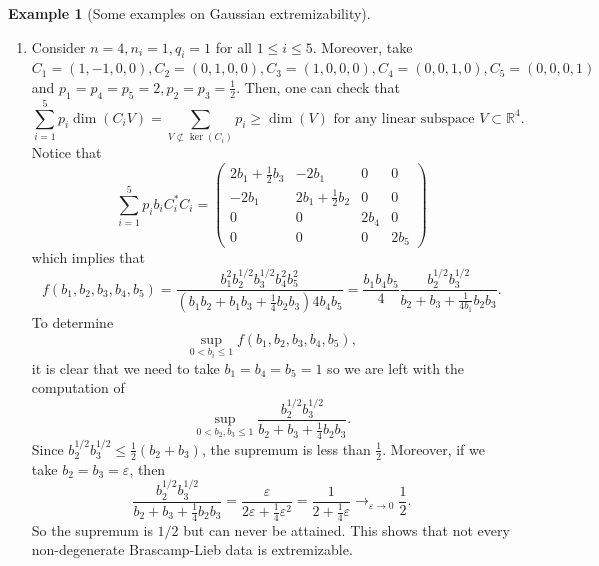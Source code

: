 \documentclass[11pt,a4paper,reqno]{amsart}
\numberwithin{equation}{section}
\theoremstyle{definition}
\newtheorem{example}[theorem]{Example}
\newcommand{\<}{\ensuremath \leq}
\renewcommand{\>}{\ensuremath \geq}
\renewcommand{\epsilon}{\varepsilon}
\begin{document}
\begin{example}[Some examples on Gaussian extremizability]
\hfill \\

\begin{enumerate} 

    \item [(i)]  Consider $n=4, n_i=1, q_i=1$ for all $1 \leq i \leq 5.$ Moreover, take $C_1=(1,-1,0,0), C_2=(0,1,0,0), C_3=(1,0,0,0), C_4=(0,0,1,0), C_5=(0,0,0,1)$ and $p_1=p_4=p_5=2,p_2=p_3=\frac{1}{2}.$ 
    Then, one can check that $$\sum_{i=1}^5 p_i\dim(C_iV)=\sum_{V \not \subset \ker(C_i)}p_i \geq \dim(V) \text{ for any linear subspace } V \subset \mathbb{R}^4.$$ 
    Notice that 
    $$\sum_{i=1}^5 p_ib_iC_i^*C_i=\begin{pmatrix}
     2b_1+\frac{1}{2}b_3 & -2b_1 & 0 & 0 \\
    -2b_1 & 2b_1+\frac{1}{2}b_2 & 0 & 0 \\
        0 & 0 & 2b_4 & 0 \\
        0 & 0 & 0 & 2b_5 
    \end{pmatrix}$$ 
    which implies that $$f(b_1,b_2,b_3,b_4,b_5)=\frac{b_1^2b_2^{1/2}b_3^{1/2}b_4^2b_5^2}{(b_1b_2+b_1b_3+\frac{1}{4}b_2b_3)4b_4b_5}=\frac{b_1b_4b_5}{4}\frac{b_2^{1/2}b_3^{1/2}}{b_2+b_3+\frac{1}{4b_1}b_2b_3}.$$ To determine $$\sup_{0<b_i \leq 1}f(b_1,b_2,b_3,b_4,b_5),$$ it is clear that we need to take $b_1=b_4=b_5=1$ so we are left with the computation of $$\sup_{0<b_2,b_3 \leq 1}\frac{b_2^{1/2}b_3^{1/2}}{b_2+b_3+\frac{1}{4}b_2b_3}.$$ Since $b_2^{1/2}b_3^{1/2} \leq \frac{1}{2}(b_2+b_3)$, the supremum is less than $\frac{1}{2}.$ Moreover, if we take $b_2=b_3=\epsilon$, then $$\frac{b_2^{1/2}b_3^{1/2}}{b_2+b_3+\frac{1}{4}b_2b_3}=\frac{\epsilon}{2\epsilon+\frac{1}{4}\epsilon^2}=\frac{1}{2+\frac{1}{4}\epsilon} \rightarrow_{\epsilon \rightarrow 0} \frac{1}{2}.$$ So the supremum is $1/2$ but can never be attained. This shows that not every non-degenerate Brascamp-Lieb data is extremizable. 
    
    \hfill \\
    

\end{enumerate}
\end{example}
\end{document}
